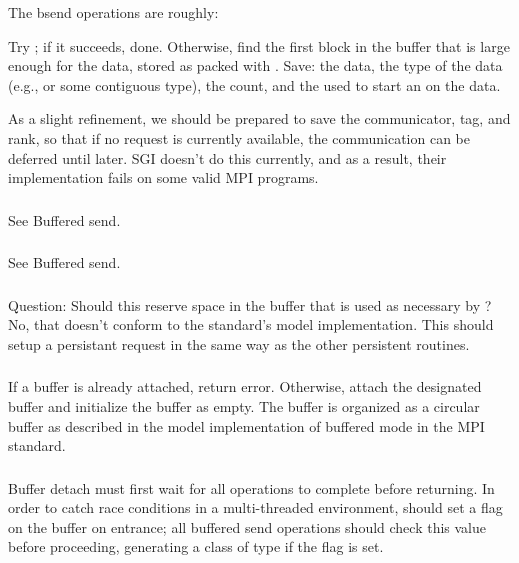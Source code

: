 \documentclass{article}
\begin{document}
The bsend operations are roughly:
\begin{adi3}
Try ; if it succeeds, done.
Otherwise, find the first block in the buffer that is large enough for
the data, stored as packed with .  
Save: the data, the type of the data (e.g.,  or some
contiguous type), the count, and the  used to start
an  on the data.

As a slight refinement, we should be prepared to save the
communicator, tag, and rank, so that if no request is currently
available, the communication can be deferred until later.  SGI doesn't
do this currently, and as a result, their implementation fails on some
valid MPI programs.
\end{adi3}

\subsubsection{}
See Buffered send.

\subsubsection{}
See Buffered send.

\subsubsection{}
Question:  Should this reserve space in the buffer that is used as
necessary by ?  No, that doesn't conform to the
standard's model implementation.  This should setup a persistant
request in the same way as the other persistent routines.

\subsubsection{}
\begin{adi3}
If a buffer is already attached, return error.
Otherwise, attach the designated buffer and initialize the buffer as empty.
The buffer is organized as a circular buffer as described in the model
implementation of buffered mode in the MPI standard.
\end{adi3}

\subsubsection{}
Buffer detach must first wait for all operations to complete before
returning.  
In order to catch race conditions in a multi-threaded environment, 
 should set a flag on the buffer on entrance; all
buffered send operations should check this value before proceeding, generating
a  class of type  if the flag is
set.
\end{document}
